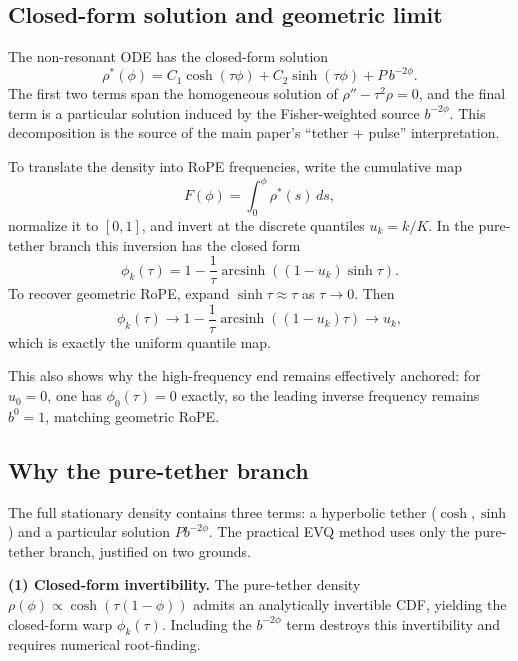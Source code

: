 \subsection{Closed-form solution and geometric limit}

The non-resonant ODE has the closed-form solution
\begin{equation}
\rho^*(\phi)=C_1\cosh(\tau\phi)+C_2\sinh(\tau\phi)+P\,b^{-2\phi}.
\end{equation}
The first two terms span the homogeneous solution of \(\rho''-\tau^2\rho=0\), and the final term is a particular solution induced by the Fisher-weighted source \(b^{-2\phi}\). This decomposition is the source of the main paper's ``tether + pulse'' interpretation.

To translate the density into RoPE frequencies, write the cumulative map
\begin{equation}
F(\phi)=\int_0^\phi \rho^*(s)\,ds,
\end{equation}
normalize it to \([0,1]\), and invert at the discrete quantiles \(u_k=k/K\). In the pure-tether branch this inversion has the closed form
\begin{equation}
\phi_k(\tau)
=
1-\frac{1}{\tau}\operatorname{arcsinh}\!\left((1-u_k)\sinh\tau\right).
\end{equation}
To recover geometric RoPE, expand \(\sinh\tau\approx\tau\) as \(\tau\to 0\). Then
\begin{equation}
\phi_k(\tau)\to 1-\frac{1}{\tau}\operatorname{arcsinh}((1-u_k)\tau)\to u_k,
\end{equation}
which is exactly the uniform quantile map.

This also shows why the high-frequency end remains effectively anchored: for \(u_0=0\), one has \(\phi_0(\tau)=0\) exactly, so the leading inverse frequency remains \(b^0=1\), matching geometric RoPE.

\subsection{Why the pure-tether branch}

The full stationary density contains three terms: a hyperbolic tether (\(\cosh, \sinh\)) and a particular solution \(Pb^{-2\phi}\). The practical EVQ method uses only the pure-tether branch, justified on two grounds.

\textbf{(1) Closed-form invertibility.} The pure-tether density \(\rho(\phi)\propto\cosh(\tau(1-\phi))\) admits an analytically invertible CDF, yielding the closed-form warp \(\phi_k(\tau)\). Including the \(b^{-2\phi}\) term destroys this invertibility and requires numerical root-finding.

